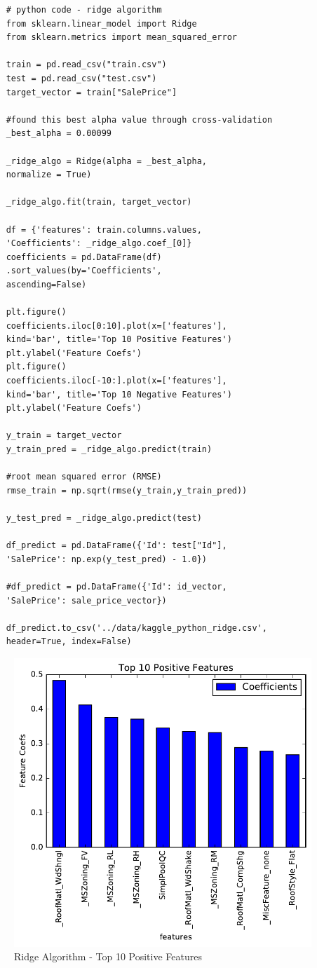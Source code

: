 \documentclass[sigconf]{acmart}
\begin{document}
	\begin{verbatim}
	# python code - ridge algorithm
	from sklearn.linear_model import Ridge
	from sklearn.metrics import mean_squared_error
	
	train = pd.read_csv("train.csv")
	test = pd.read_csv("test.csv")
	target_vector = train["SalePrice"]
	
	#found this best alpha value through cross-validation
	_best_alpha = 0.00099
	
	_ridge_algo = Ridge(alpha = _best_alpha, 
	normalize = True)		
	
	_ridge_algo.fit(train, target_vector)   
	
	df = {'features': train.columns.values, 
	'Coefficients': _ridge_algo.coef_[0]}	          
	coefficients = pd.DataFrame(df)
	.sort_values(by='Coefficients', 
	ascending=False)
	
	plt.figure()
	coefficients.iloc[0:10].plot(x=['features'], 
	kind='bar', title='Top 10 Positive Features')	                 
	plt.ylabel('Feature Coefs')	
	plt.figure()
	coefficients.iloc[-10:].plot(x=['features'], 
	kind='bar', title='Top 10 Negative Features')
	plt.ylabel('Feature Coefs')
	
	y_train = target_vector
	y_train_pred = _ridge_algo.predict(train)
	
	#root mean squared error (RMSE)
	rmse_train = np.sqrt(rmse(y_train,y_train_pred))	
	
	y_test_pred = _ridge_algo.predict(test)
	
	df_predict = pd.DataFrame({'Id': test["Id"], 
	'SalePrice': np.exp(y_test_pred) - 1.0})
	
	#df_predict = pd.DataFrame({'Id': id_vector, 
	'SalePrice': sale_price_vector})
	
	df_predict.to_csv('../data/kaggle_python_ridge.csv',
	header=True, index=False)	
	\end{verbatim}
	
	\begin{figure}[H]
		\centering
		\includegraphics[width=0.8\columnwidth]{images/ridge_feature_ranking_pos}	
		\caption{Ridge Algorithm - Top 10 Positive Features} \label{fig:ridge_feature_ranking_pos} 
	\end{figure}
	
\end{document}
